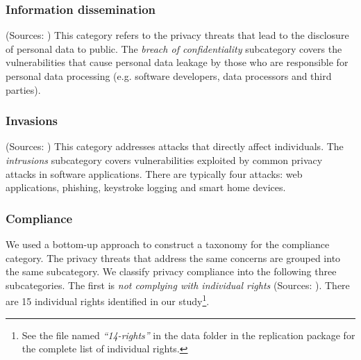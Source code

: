 \subsubsection{\textbf{Information dissemination}} (Sources: \cite{Calciati, Jana2013, Lucia2012, Zhang2020a, OWASPsurvey}) This category refers to the privacy threats that lead to the disclosure of personal data to public. The \emph{breach of confidentiality} subcategory covers the vulnerabilities that cause personal data leakage by those who are responsible for personal data processing (e.g. software developers, data processors and third parties).

\subsubsection{\textbf{Invasions}} (Sources: \cite{Deng2011, Reinheimer2020, OWASPsurvey, Nortona}) This category addresses attacks that directly affect individuals. The \emph{intrusions} subcategory covers vulnerabilities exploited by common privacy attacks in software applications. There are typically four attacks: web applications, phishing, keystroke logging and smart home devices. %


\subsubsection{\textbf{Compliance}} \label{subsec:compliance}

We used a bottom-up approach to construct a taxonomy for the compliance category. The privacy threats that address the same concerns are grouped into the same subcategory. We classify privacy compliance into the following three subcategories. The first is \emph{not complying with individual rights} (Sources: \cite{OfficeJournaloftheEuropeanUnion;2016, CCPA, HIPAA, GLBA, US1974, APA, ISO/IEC2011, Deng2011, Omoronyia2013a, Bhatia2018a, Yu2021, Mihaylov2016a, OWASPsurvey}). There are 15 individual rights identified in our study\footnote{See the file named \emph{``14-rights''} in the data folder in the replication package for the complete list of individual rights.}. %

